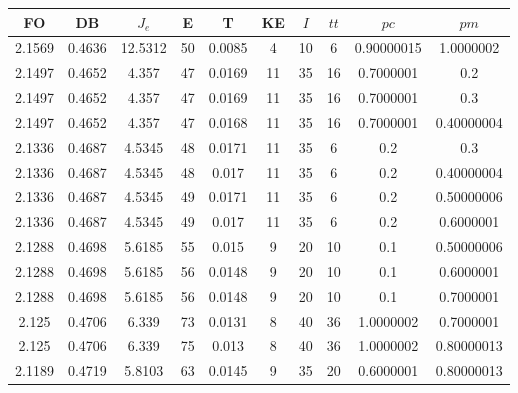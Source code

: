 \begin{table}[h!]
    \footnotesize
    \begin{center}
        \begin{tabular}{|c|c|c|c|c|c|c|c|c|c|}
        \hline
            {\bf FO} & {\bf DB} & $J_e$ & {\bf E} & {\bf T} & {\bf KE} & $I$ & $tt$ & $pc$ & $pm$ \\
        \hline
        \hline
            2.1569 & 0.4636  & 12.5312 & 50 & 0.0085 & 4 & 10 & 6 & 0.90000015 & 1.0000002\\
        \hline
        \hline
            2.1497 & 0.4652  & 4.357 & 47 & 0.0169 & 11 & 35 & 16 & 0.7000001 & 0.2\\
        \hline
        \hline
            2.1497 & 0.4652  & 4.357 & 47 & 0.0169 & 11 & 35 & 16 & 0.7000001 & 0.3\\
        \hline
        \hline
            2.1497 & 0.4652  & 4.357 & 47 & 0.0168 & 11 & 35 & 16 & 0.7000001 & 0.40000004\\
        \hline
        \hline
            2.1336 & 0.4687  & 4.5345 & 48 & 0.0171 & 11 & 35 & 6 & 0.2 & 0.3\\
        \hline
        \hline
            2.1336 & 0.4687  & 4.5345 & 48 & 0.017 & 11 & 35 & 6 & 0.2 & 0.40000004\\
        \hline
        \hline
            2.1336 & 0.4687  & 4.5345 & 49 & 0.0171 & 11 & 35 & 6 & 0.2 & 0.50000006\\
        \hline
        \hline
            2.1336 & 0.4687  & 4.5345 & 49 & 0.017 & 11 & 35 & 6 & 0.2 & 0.6000001\\
        \hline
        \hline
            2.1288 & 0.4698  & 5.6185 & 55 & 0.015 & 9 & 20 & 10 & 0.1 & 0.50000006\\
        \hline
        \hline
            2.1288 & 0.4698  & 5.6185 & 56 & 0.0148 & 9 & 20 & 10 & 0.1 & 0.6000001\\
        \hline
        \hline
            2.1288 & 0.4698  & 5.6185 & 56 & 0.0148 & 9 & 20 & 10 & 0.1 & 0.7000001\\
        \hline
        \hline
            2.125 & 0.4706  & 6.339 & 73 & 0.0131 & 8 & 40 & 36 & 1.0000002 & 0.7000001\\
        \hline
        \hline
            2.125 & 0.4706  & 6.339 & 75 & 0.013 & 8 & 40 & 36 & 1.0000002 & 0.80000013\\
        \hline
        \hline
            2.1189 & 0.4719  & 5.8103 & 63 & 0.0145 & 9 & 35 & 20 & 0.6000001 & 0.80000013\\
        \hline

\end{tabular}
\end{center}
\end{table}
